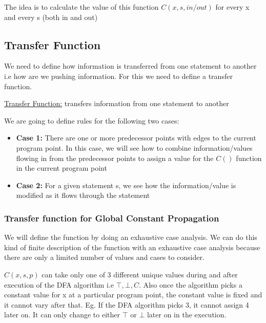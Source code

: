 The idea is to calculate the value of this function $C(x, s, in/out)$ for every x and every s (both in and out)

\subsection{Transfer Function}

We need to define how information is transferred from one statement to another i.e how are we pushing information. For this we need to define a transfer function.

\begin{center}
    \underline{Transfer Function:} transfers information from one statement to another
\end{center}

We are going to define rules for the following two cases:

\begin{itemize}
    \item \textbf{Case 1:} There are one or more predecessor points with edges to the current program point. In this case, we will see how to combine information/values flowing in from the predecessor points to assign a value for the $C()$ function in the current program point
    \item \textbf{Case 2:} For a given statement s, we see how the information/value is modified as it flows through the statement
\end{itemize}

\subsubsection{Transfer function for Global Constant Propagation}

We will define the function by doing an exhaustive case analysis. We can do this kind of finite description of the function with an exhaustive case analysis because there are only a limited number of values and cases to consider.

\vspace{0.3cm}

$C(x, s, p)$ can take only one of 3 different unique values during and after execution of the DFA algorithm i.e $\top, \bot, C$. Also once the algorithm picks a constant value for x at a particular program point, the constant value is fixed and it cannot vary after that. Eg. If the DFA algorithm picks 3, it cannot assign 4 later on. It can only change to either $\top$ or $\bot$ later on in the execution.

